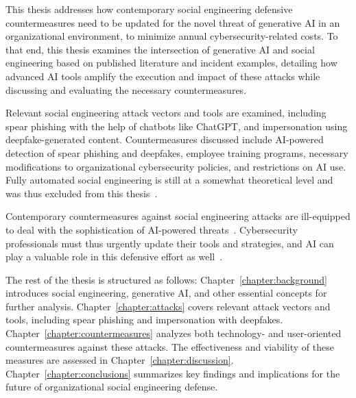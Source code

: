 %
%
This thesis addresses how contemporary social engineering defensive countermeasures need to be updated for the novel threat of generative AI in an organizational environment, to minimize annual cybersecurity-related costs. To that end, this thesis examines the intersection of generative AI and social engineering based on published literature and incident examples, detailing how advanced AI tools amplify the execution and impact of these attacks while discussing and evaluating the necessary countermeasures.





%
%
Relevant social engineering attack vectors and tools are examined, including spear phishing with the help of chatbots like ChatGPT, and impersonation using deepfake-generated content. Countermeasures discussed include AI-powered detection of spear phishing and deepfakes, employee training programs, necessary modifications to organizational cybersecurity policies, and restrictions on AI use. Fully automated social engineering is still at a somewhat theoretical level and was thus excluded from this thesis~\citep{hatfield_SE_Evolution_Concept_2018}.

\newpage

%
%
Contemporary countermeasures against social engineering attacks are ill-equipped to deal with the sophistication of AI-powered threats~\citep{blauth_AI_Crime_Overview_Malicious_Use_Abuse_2022, king_AI_Crime_Interdisciplinary_Analysis_2019}. Cybersecurity professionals must thus urgently update their tools and strategies, and AI can play a valuable role in this defensive effort as well~\citep{fakhouri_AI_Driven_Solutions_SE_Attacks_2024, tsinganos_Towards_Automated_Recognition_Chat_SE_Enterprise_2018}.





%
%
The rest of the thesis is structured as follows: Chapter~\ref{chapter:background} introduces social engineering, generative AI, and other essential concepts for further analysis. Chapter~\ref{chapter:attacks} covers relevant attack vectors and tools, including spear phishing and impersonation with deepfakes. Chapter~\ref{chapter:countermeasures} analyzes both technology- and user-oriented countermeasures against these attacks. The effectiveness and viability of these measures are assessed in Chapter~\ref{chapter:discussion}. Chapter~\ref{chapter:conclusions} summarizes key findings and implications for the future of organizational social engineering defense.

